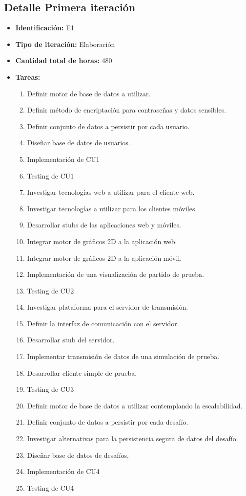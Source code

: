 \documentclass[a4paper, 10pt, twoside]{article}
\begin{document}
\subsection{Detalle Primera iteración}

\begin{itemize}
  \item \textbf{Identificación:} E1
  \item \textbf{Tipo de iteración:} Elaboración
  \item \textbf{Cantidad total de horas:} 480
  \item \textbf{Tareas:}
\begin{enumerate}
  \item Definir motor de base de datos a utilizar.
  \item Definir método de encriptación para contraseñas y datos sensibles.
  \item Definir conjunto de datos a persistir por cada usuario.
  \item Diseñar base de datos de usuarios.
  \item Implementación de CU1
  \item Testing de CU1
  \item Investigar tecnologías web a utilizar para el cliente web.
  \item Investigar tecnologías a utilizar para los clientes móviles.
  \item Desarrollar stubs de las aplicaciones web y móviles.
  \item Integrar motor de gráficos 2D a la aplicación web.
  \item Integrar motor de gráficos 2D a la aplicación móvil.
  \item Implementación de una visualización de partido de prueba.
  \item Testing de CU2
  \item Investigar plataforma para el servidor de transmisión.
  \item Definir la interfaz de comunicación con el servidor.
  \item Desarrollar stub del servidor.
  \item Implementar transmisión de datos de una simulación de prueba.
  \item Desarrollar cliente simple de prueba.
  \item Testing de CU3
  \item Definir motor de base de datos a utilizar contemplando la escalabilidad.
  \item Definir conjunto de datos a persistir por cada desafío.
  \item Investigar alternativas para la persistencia segura de datos del desafío.
  \item Diseñar base de datos de desafíos.
  \item Implementación de CU4
  \item Testing de CU4
\end{enumerate}
\end{itemize}
\end{document}
